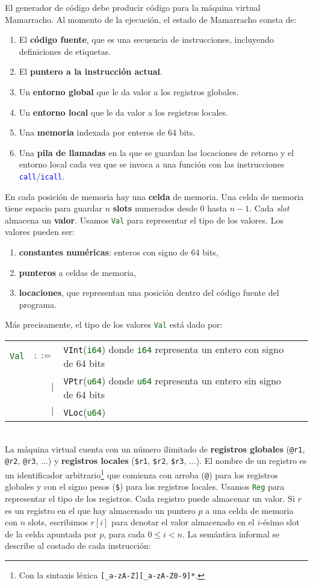 \documentclass{article}
\newcommand{\mamarracho}{\textsf{Mamarracho}\xspace}
\newcommand{\ALT}{
  \\ & $\mid$ &
}
\newcommand{\type}[1]{\textcolor{darkgreen}{\texttt{#1}}}
\newcommand{\datadecl}[2]{\noindent
  \begin{tabularx}{\textwidth}{lrp{13cm}r}
  #1 & $::=$ & #2
  \end{tabularx}\\
}
\newcommand{\instruction}[1]{\texttt{\textcolor{blue}{#1}}}
\begin{document}
\noindent
El generador de código debe producir código para la máquina virtual
\mamarracho.
Al momento de la ejecución, el estado de \mamarracho consta de:
\begin{enumerate}
\item El {\bf código fuente}, que es una secuencia de instrucciones,
      incluyendo definiciones de etiquetas.
\item El {\bf puntero a la instrucción actual}.
\item Un {\bf entorno global} que le da valor a los registros globales.
\item Un {\bf entorno local} que le da valor a los registros locales.
\item Una {\bf memoria} indexada por enteros de 64 bits.
\item Una {\bf pila de llamadas} en la que se guardan las locaciones
      de retorno y el entorno local cada vez que se invoca a una
      función con las instrucciones \instruction{call}/\instruction{icall}.
\end{enumerate}
En cada posición de memoria hay una {\bf celda} de memoria.
Una celda de memoria tiene espacio para guardar $n$ {\bf slots} numerados desde $0$ hasta $n-1$.
Cada {\em slot} almacena un {\bf valor}.
Usamos \type{Val} para representar el tipo de los valores.
Los valores pueden ser:
\begin{enumerate}
\item {\bf constantes numéricas}: enteros con signo de 64 bits,
\item {\bf punteros} a celdas de memoria,
\item {\bf locaciones}, que representan una posición dentro del código fuente
      del programa.
\end{enumerate}
Más precisamente, el tipo de los valores \type{Val} está dado por:\medskip

\datadecl{\type{Val}}{
  \texttt{VInt}(\type{i64})
  \hfill {\small donde \type{i64} representa un entero con signo de 64 bits}
\ALT
  \texttt{VPtr}(\type{u64})
  \hfill {\small donde \type{u64} representa un entero sin signo de 64 bits}
\ALT
  \texttt{VLoc}(\type{u64})
}

\bigskip
La máquina virtual cuenta con un número ilimitado
de {\bf registros globales}
(\texttt{@r1}, \texttt{@r2}, \texttt{@r3}, $\hdots$)
y {\bf registros locales}
(\texttt{\$r1}, \texttt{\$r2}, \texttt{\$r3}, $\hdots$).
El nombre de un registro es un identificador arbitrario\footnote{Con
la sintaxis léxica \texttt{[\_a-zA-Z][\_a-zA-Z0-9]*}.}
que comienza con arroba (\texttt{@}) para los registros globales
y con el signo pesos (\texttt{\$}) para los registros locales.
Usamos \type{Reg} para representar el tipo de los registros.
Cada registro puede almacenar un valor.
Si $r$ es un registro en el que hay almacenado un puntero \texttt{$p$}
a una celda de memoria con $n$ slots,
escribimos $r[i]$ para denotar el valor almacenado en el $i$-ésimo slot de la celda
apuntada por $p$, para cada $0 \leq i < n$.
La semántica informal se describe al costado de cada instrucción:
\bigskip
\end{document}
